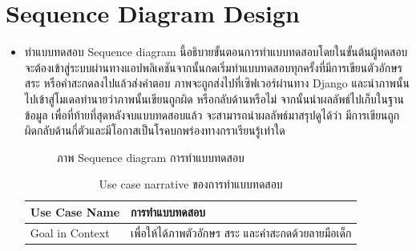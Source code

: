 \documentclass[12pt,oneside,openright,a4paper]{cpe-thai-project}
\begin{document}
\section{Sequence Diagram Design}
   \begin{itemize}
    \item ทำแบบทดสอบ 
    Sequence diagram นี้อธิบายขั้นตอนการทำแบบทดสอบโดยในขั้นต้นผู้ทดสอบจะต้องเข้าสู่ระบบผ่านทางแอปพลิเคชันจากนั้นกดเริ่มทำแบบทดสอบทุกครั้งที่มีการเขียนตัวอักษร สระ หรือคำสะกดลงไปแล้วส่งคำตอบ ภาพจะถูกส่งไปที่เซิฟเวอร์ผ่านทาง Django และนำภาพนั้นไปเข้าสู่โมเดลทำนายว่าภาพนั้นเขียนถูกผิด หรือกลับด้านหรือไม่ จากนั้นนำผลลัพธ์ไปเก็บในฐานข้อมูล เพื่อที่ท้ายที่สุดหลังจบแบบทดสอบแล้ว จะสามารถนำผลลัพธ์มาสรุปดูได้ว่า มีการเขียนถูกผิดกลับด้านกี่ตัวและมีโอกาสเป็นโรคบกพร่องทางกราเรียนรู้เท่าใด 
    \begin{figure}[!ht]\centering
      \setlength{\fboxrule}{0.2mm} %
      \setlength{\fboxsep}{1cm}
      \caption{ภาพ Sequence diagram การทำแบบทดสอบ}\label{fig:activity1}
     \end{figure}
     \newpage
     \begin{table}[!h]\centering
      \caption{Use case narrative ของการทำแบบทดสอบ}\label{tbl:application1}
      \begin{tabular}{|p{4cm}|p{10cm}|} \hline
      Use Case Name & การทำแบบทดสอบ \\ \hline
      Goal in Context & เพื่อให้ได้ภาพตัวอักษร สระ และคำสะกดด้วยลายมือเด็ก \\ \hline

\end{tabular}
\end{table}
\end{itemize}
\end{document}
